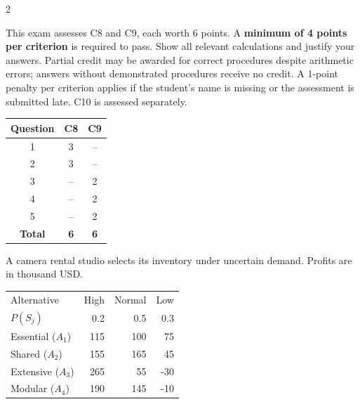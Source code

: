 	\begin{multicols}{2}
		\raggedcolumns
		
		This exam assesses C8 and C9, each worth 6 points. A \textbf{minimum of 4 points per criterion} is required to pass. Show all relevant calculations and justify your answers. Partial credit may be awarded for correct procedures despite arithmetic errors; answers without demonstrated procedures receive no credit. A 1-point penalty per criterion applies if the student's name is missing or the assessment is submitted late. C10 is assessed separately.
		
		\vspace{-3mm}
		\begin{center}
			\begin{tabular}{|c|c|c|}
				\hline
				\textbf{Question} & \textbf{C8} & \textbf{C9} \\ \hline
				1 & 3 & -- \\ \hline
				2 & 3 & -- \\ \hline
				3 & -- & 2 \\ \hline
				4 & -- & 2 \\ \hline
				5 & -- & 2 \\ \hline
				\textbf{Total} & \textbf{6} & \textbf{6} \\ \hline
			\end{tabular}
		\end{center}
		\vspace{-3mm}
		
		
A camera rental studio selects its inventory under uncertain demand. Profits are in thousand USD.

\vspace{-3mm}
\begin{center}\small\setlength{\tabcolsep}{4pt}
	\begin{tabular}{lrrr}\toprule
		Alternative & High & Normal & Low\\
		$P(S_j)$ & 0.2 & 0.5 & 0.3\\ \midrule
				Essential ($A_1$) & 115 & 100 & 75\\
		Shared ($A_2$) & 155 & 165 & 45\\
		Extensive ($A_3$) & 265 & 55 & -30\\
		Modular ($A_4$) & 190 & 145 & -10\\
		\bottomrule
	\end{tabular}
\end{center} \vspace*{-3mm}


\end{multicols}
